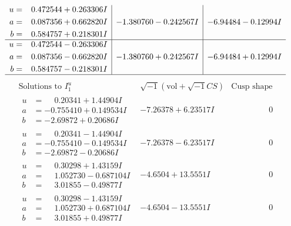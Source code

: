 \documentclass[1p]{elsarticle_modified}
\theoremstyle{definition}
\newcommand{\I}{\sqrt{-1}}
\begin{document}
$$\begin{array}{c|c|c}
\begin{aligned}
u &= \phantom{-}0.472544 + 0.263306 I \\
a &= \phantom{-}0.087356 + 0.662820 I \\
b &= \phantom{-}0.584757 + 0.218301 I\end{aligned}
 & -1.380760 - 0.242567 I & -6.94484 - 0.12994 I \\ \hline\begin{aligned}
u &= \phantom{-}0.472544 - 0.263306 I \\
a &= \phantom{-}0.087356 - 0.662820 I \\
b &= \phantom{-}0.584757 - 0.218301 I\end{aligned}
 & -1.380760 + 0.242567 I & -6.94484 + 0.12994 I\\
 \hline 
 \end{array}$$\newpage$$\begin{array}{c|c|c}  
\text{Solutions to }I^u_{1}& \I (\text{vol} + \sqrt{-1}CS) & \text{Cusp shape}\\
 \hline 
\begin{aligned}
u &= \phantom{-}0.20341 + 1.44904 I \\
a &= -0.755410 + 0.149534 I \\
b &= -2.69872 + 0.20686 I\end{aligned}
 & -7.26378 + 6.23517 I & \phantom{-0.000000 } 0 \\ \hline\begin{aligned}
u &= \phantom{-}0.20341 - 1.44904 I \\
a &= -0.755410 - 0.149534 I \\
b &= -2.69872 - 0.20686 I\end{aligned}
 & -7.26378 - 6.23517 I & \phantom{-0.000000 } 0 \\ \hline\begin{aligned}
u &= \phantom{-}0.30298 + 1.43159 I \\
a &= \phantom{-}1.052730 - 0.687104 I \\
b &= \phantom{-}3.01855 - 0.49877 I\end{aligned}
 & -4.6504 + 13.5551 I & \phantom{-0.000000 } 0 \\ \hline\begin{aligned}
u &= \phantom{-}0.30298 - 1.43159 I \\
a &= \phantom{-}1.052730 + 0.687104 I \\
b &= \phantom{-}3.01855 + 0.49877 I\end{aligned}
 & -4.6504 - 13.5551 I & \phantom{-0.000000 } 0 \\ \hline\begin{aligned}

\end{aligned}
\end{array}$$
\end{document}
